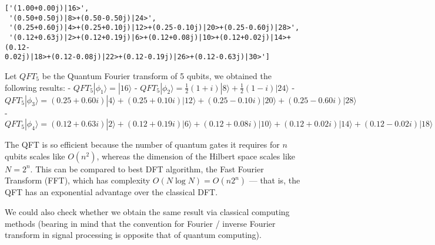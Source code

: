 \documentclass[11pt]{article}
\makeatletter
\newcommand{\boxspacing}{\kern\kvtcb@left@rule\kern\kvtcb@boxsep}
\newcommand{\prompt}[4]{
        {\ttfamily\llap{{\color{#2}[#3]:\hspace{3pt}#4}}\vspace{-\baselineskip}}
    }
\makeatother
\begin{document}
            \begin{tcolorbox}[breakable, size=fbox, boxrule=.5pt, pad at break*=1mm, opacityfill=0]
\prompt{Out}{outcolor}{71}{\boxspacing}
\begin{Verbatim}[commandchars=\\\{\}]
['(1.00+0.00j)|16>',
 '(0.50+0.50j)|8>+(0.50-0.50j)|24>',
 '(0.25+0.60j)|4>+(0.25+0.10j)|12>+(0.25-0.10j)|20>+(0.25-0.60j)|28>',
 '(0.12+0.63j)|2>+(0.12+0.19j)|6>+(0.12+0.08j)|10>+(0.12+0.02j)|14>+(0.12-
0.02j)|18>+(0.12-0.08j)|22>+(0.12-0.19j)|26>+(0.12-0.63j)|30>']
\end{Verbatim}
\end{tcolorbox}
        
    Let \(QFT_5\) be the Quantum Fourier transform of 5 qubits, we obtained
the following results: - \(QFT_5|\phi_1\rangle = |16⟩\) -
\(QFT_5|\phi_2\rangle = \frac{1}{2}(1+i)|8⟩+\frac{1}{2}(1-i)|24⟩\) -
\(QFT_5|\phi_3\rangle = (0.25+0.60i)|4⟩+(0.25+0.10 i)|12⟩+(0.25-0.10 i) |20⟩ + (0.25-0.60i)|28⟩\)
-
\(QFT_5|\phi_4\rangle = (0.12+0.63i)|2⟩+(0.12+0.19i)|6⟩+(0.12+0.08i)|10⟩+(0.12+0.02i)|14⟩+(0.12-0.02i)|18⟩+(0.12-0.08i)|22⟩+(0.12-0.19i)|26⟩+(0.12-0.63i)|30⟩\)

The QFT is so efficient because the number of quantum gates it requires
for \(n\) qubits scales like \(O(n^2)\), whereas the dimension of the
Hilbert space scales like \(N=2^n\). This can be compared to best DFT
algorithm, the Fast Fourier Transform (FFT), which has complexity
\(O(N\log N)=O(n2^n)\) --- that is, the QFT has an exponential advantage
over the classical DFT.

We could also check whether we obtain the same result via classical
computing methods (bearing in mind that the convention for Fourier /
inverse Fourier transform in signal processing is opposite that of
quantum computing).
\end{document}
